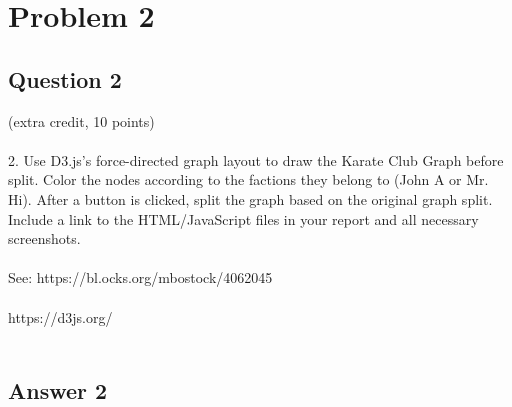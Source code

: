 \documentclass[10pt,letterpaper]{article}
\begin{document}
\pagebreak 
\section{Problem 2}
\subsection{Question 2}
(extra credit, 10 points)\\
\\
2. Use D3.js's force-directed graph layout to draw the Karate Club Graph before split. Color the nodes according to the factions they belong to (John A or Mr. Hi). After a button is clicked, split the graph based on the original graph split. Include a link to the HTML/JavaScript files in your report and all necessary screenshots.\\
\\
See: https://bl.ocks.org/mbostock/4062045\\
\\
https://d3js.org/\\
\\
\subsection{Answer 2}
\end{document}
